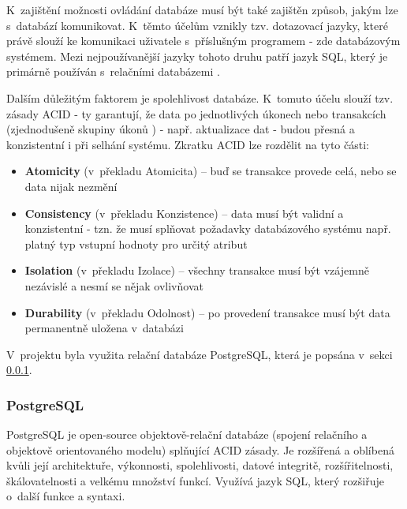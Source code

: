	K~zajištění možnosti ovládání databáze musí být také zajištěn způsob, jakým lze s~databází komunikovat. K~těmto účelům vznikly tzv. dotazovací jazyky, které právě slouží ke komunikaci uživatele s~příslušným programem \cite{DotazJazyk} - zde databázovým systémem. Mezi nejpoužívanější jazyky tohoto druhu patří jazyk SQL, který je primárně používán s~relačními databázemi \cite{SQL}.
	
	Dalším důležitým faktorem je spolehlivost databáze. K~tomuto účelu slouží tzv. zásady ACID - ty garantují, že data po jednotlivých úkonech nebo transakcích (zjednodušeně skupiny úkonů \cite{Transakce}) - např. aktualizace dat - budou přesná a konzistentní i při selhání systému. Zkratku ACID lze rozdělit na tyto části:
	
	\begin{itemize}
		\item \textbf{Atomicity} (v~překladu Atomicita) – buď se transakce provede celá, nebo se data nijak nezmění \cite{ACID}
		\item \textbf{Consistency} (v~překladu Konzistence) – data musí být validní a konzistentní - tzn. že musí splňovat požadavky databázového systému např. platný typ vstupní hodnoty pro určitý atribut \cite{ACID}
		\item \textbf{Isolation} (v~překladu Izolace) – všechny transakce musí být vzájemně nezávislé a nesmí se nějak ovlivňovat \cite{ACID}
		\item \textbf{Durability} (v~překladu Odolnost) – po provedení transakce musí být data permanentně uložena v~databázi \cite{ACID}
	\end{itemize}
	
	V~projektu byla využita relační databáze PostgreSQL, která je popsána v~sekci \ref{sec:pgsql}.
	
		\subsubsection{PostgreSQL}\label{sec:pgsql}
		PostgreSQL je open-source objektově-relační databáze (spojení relačního a objektově orientovaného modelu) splňující ACID zásady. Je rozšířená a oblíbená kvůli její architektuře, výkonnosti, spolehlivosti, datové integritě, rozšířitelnosti, škálovatelnosti a velkému množství funkcí. Využívá jazyk SQL, který rozšiřuje o~další funkce a syntaxi. \cite{PostgreSQL}
